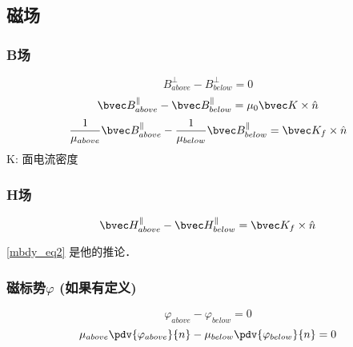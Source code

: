 \subsection{磁场}

\subsubsection{B场}
\begin{equation}
B^\perp_{above} - B^\perp_{below} = 0
\end{equation}
\begin{equation}
\bvec B^\parallel_{above} - \bvec B^\parallel_{below} = \mu_0\bvec K \times \hat n 
\end{equation}
\begin{equation}\label{mbdy_eq2}
\frac{1}{\mu_{above}}\bvec B^\parallel_{above} - \frac{1}{\mu_{below}} \bvec B^\parallel_{below} = \bvec K_f \times \hat n 
\end{equation}
K: 面电流密度

\subsubsection{H场}
\begin{equation}
\bvec H^\parallel_{above} - \bvec H^\parallel_{below} = \bvec K_f \times \hat n 
\end{equation}

\autoref{mbdy_eq2}  是他的推论．


\subsubsection{磁标势$\varphi$ (如果有定义)}
\begin{equation}
\varphi_{above}-\varphi_{below}=0
\end{equation}
\begin{equation}
\mu_{above}\pdv{\varphi_{above}}{n} - \mu_{below}\pdv{\varphi_{below}}{n}  = 0
\end{equation}

